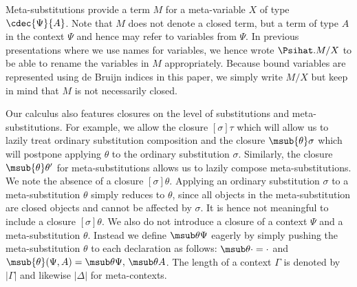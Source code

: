 \documentclass[copyright,creativecommons]{eptcs}
\newcommand{\msubp}[2]{\msub{#1}(#2)}
\newcommand{\cempty}{\mathord{\cdot}}
\begin{document}
Meta-substitutions provide a term $M$ for a meta-variable $X$ of type
$\cdec{\Psi}{A}$. Note that $M$ does not denote a closed term, but a
term of type $A$ in the context $\Psi$ and hence may refer to
variables from $\Psi$. In previous presentations where we use names
for variables, we hence wrote $\Psihat.M/X$ to be able to rename the
variables in $M$ appropriately. Because bound variables
are represented using de Bruijn indices in this paper, we simply write
$M/X$ but keep in mind that $M$ is not necessarily closed.

Our calculus also features closures on the level of substitutions and
meta-substitutions. For example, we allow the closure $[\sigma]\tau$
which will allow us to lazily treat ordinary substitution
composition and the closure $\msub{\theta}\sigma$ which will postpone
applying $\theta$ to the ordinary substitution $\sigma$. Similarly,
the closure $\msub{\theta}\theta'$ for meta-substitutions allows us to
lazily compose meta-substitutions. We note the absence of a closure
$[\sigma]\theta$. Applying an ordinary substitution $\sigma$ to a
meta-substitution $\theta$ simply reduces to $\theta$, since all
objects in the meta-substitution are closed objects and cannot be 
affected by $\sigma$. It is hence not meaningful to include a closure
$[\sigma]\theta$. 
We also do not introduce a closure of a context $\Psi$ and a
meta-substitution $\theta$. Instead we define $\msub \theta \Psi$ eagerly
by simply pushing the meta-substitution $\theta$ to each
declaration as follows: $\msub \theta \cempty = \cempty$ and $\msubp \theta {\Psi,A} = \msub
\theta \Psi,\, \msub \theta A$.  The length of a context $\Gamma$ is
denoted by $|\Gamma|$ and likewise $|\Delta|$ for meta-contexts.
\end{document}
